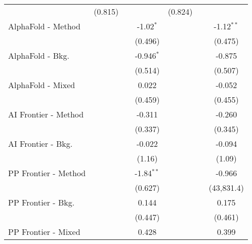 \begin{tabular}{lcccccc}
                                  & (0.815)       &              &               & (0.824)        &               &   \\   
   AlphaFold - Method             &               &              & -1.02$^{*}$   &                &               & -1.12$^{**}$\\   
                                  &               &              & (0.496)       &                &               & (0.475)\\   
   AlphaFold - Bkg.               &               &              & -0.946$^{*}$  &                &               & -0.875\\   
                                  &               &              & (0.514)       &                &               & (0.507)\\   
   AlphaFold - Mixed              &               &              & 0.022         &                &               & -0.052\\   
                                  &               &              & (0.459)       &                &               & (0.455)\\   
   AI Frontier - Method           &               &              & -0.311        &                &               & -0.260\\   
                                  &               &              & (0.337)       &                &               & (0.345)\\   
   AI Frontier - Bkg.             &               &              & -0.022        &                &               & -0.094\\   
                                  &               &              & (1.16)        &                &               & (1.09)\\   
   PP Frontier - Method           &               &              & -1.84$^{**}$  &                &               & -0.966\\   
                                  &               &              & (0.627)       &                &               & (43,831.4)\\   
   PP Frontier - Bkg.             &               &              & 0.144         &                &               & 0.175\\   
                                  &               &              & (0.447)       &                &               & (0.461)\\   
   PP Frontier - Mixed            &               &              & 0.428         &                &               & 0.399\\   

\end{tabular}
